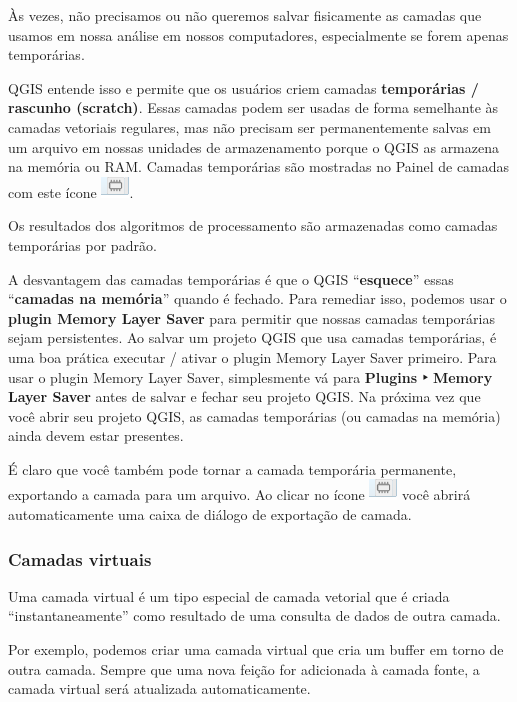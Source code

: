 \documentclass[
]{book}
\begin{document}
Às vezes, não precisamos ou não queremos salvar fisicamente as camadas que usamos em nossa análise em nossos computadores, especialmente se forem apenas temporárias.

QGIS entende isso e permite que os usuários criem camadas \textbf{temporárias / rascunho (scratch)}. Essas camadas podem ser usadas de forma semelhante às camadas vetoriais regulares, mas não precisam ser permanentemente salvas em um arquivo em nossas unidades de armazenamento porque o QGIS as armazena na memória ou RAM. Camadas temporárias são mostradas no Painel de camadas com este ícone \includegraphics{media/modulo2/symbol-temp.png}.

Os resultados dos algoritmos de processamento são armazenadas como camadas temporárias por padrão.

A desvantagem das camadas temporárias é que o QGIS ``\textbf{esquece}'' essas ``\textbf{camadas na memória}'' quando é fechado. Para remediar isso, podemos usar o \textbf{plugin Memory Layer Saver} para permitir que nossas camadas temporárias sejam persistentes. Ao salvar um projeto QGIS que usa camadas temporárias, é uma boa prática executar / ativar o plugin Memory Layer Saver primeiro. Para usar o plugin Memory Layer Saver, simplesmente vá para \textbf{Plugins ‣ Memory Layer Saver} antes de salvar e fechar seu projeto QGIS. Na próxima vez que você abrir seu projeto QGIS, as camadas temporárias (ou camadas na memória) ainda devem estar presentes.

É claro que você também pode tornar a camada temporária permanente, exportando a camada para um arquivo. Ao clicar no ícone \includegraphics{media/modulo2/symbol-temp.png} você abrirá automaticamente uma caixa de diálogo de exportação de camada.

\hypertarget{camadas-virtuais}{%
\subsubsection{\texorpdfstring{\textbf{Camadas virtuais}}{Camadas virtuais}}\label{camadas-virtuais}}

Uma camada virtual é um tipo especial de camada vetorial que é criada ``instantaneamente'' como resultado de uma consulta de dados de outra camada.

Por exemplo, podemos criar uma camada virtual que cria um buffer em torno de outra camada. Sempre que uma nova feição for adicionada à camada fonte, a camada virtual será atualizada automaticamente.
\end{document}
